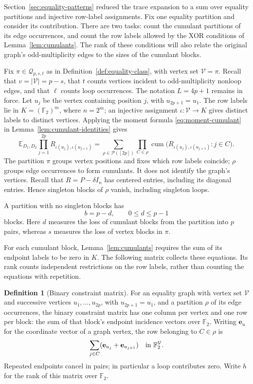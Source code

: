 \documentclass[11pt]{article}
\theoremstyle{definition}
\newtheorem{definition}{Definition}[section]
\theoremstyle{remark}
\theoremstyle{plain}
\newcommand{\E}{\mathbb E}
\newcommand{\F}{\mathbb F}
\DeclareMathOperator{\cum}{cum}
\begin{document}
Section~\ref{sec:equality-patterns} reduced the trace expansion to a
sum over equality partitions and injective row-label assignments.
Fix one equality partition and consider its contribution. There
are two tasks: count the cumulant partitions of its edge occurrences,
and count the row labels allowed by the XOR conditions of
Lemma~\ref{lem:cumulants}. The rank of these conditions will also
relate the original graph's odd-multiplicity edges to the sizes
of the cumulant blocks.

Fix $\pi\in\mathcal Q_{p,s,t}$ as in
Definition~\ref{def:equality-class}, with vertex set $\mathcal V=\pi$.
Recall that $v=|\mathcal V|=p-s$, that $t$ counts vertices incident
to odd-multiplicity nonloop edges, and that $\ell$ counts loop
occurrences. The notation $L=4p+1$ remains in force.
Let $u_j$ be the vertex containing position $j$, with $u_{2p+1}=u_1$.
The row labels lie in $K=(\F_2)^m$, where $n=2^m$; an injective
assignment $\iota:\mathcal V\to K$ gives distinct labels to distinct
vertices. Applying the moment formula \eqref{eq:moment-cumulant}
in Lemma~\ref{lem:cumulant-identities} gives
\begin{equation}\label{eq:entry-moment-expansion}
 \E_{D_1,D_2}\prod_{j=1}^{2p}R_{\iota(u_j),\iota(u_{j+1})}
   =\sum_{\rho\in\mathcal P([2p])}
      \prod_{C\in\rho}
        \cum\bigl(R_{\iota(u_j),\iota(u_{j+1})}:j\in C\bigr).
\end{equation}
The partition $\pi$ groups vertex positions and fixes which row
labels coincide; $\rho$ groups edge occurrences to form cumulants.
It does not identify the graph's vertices. Recall that
$R=P-\delta I_n$ has centered entries, including its diagonal
entries. Hence singleton blocks of $\rho$ vanish, including singleton
loops.

\begin{samepage}
A partition with no singleton blocks has
\[
                         b=p-d,\qquad 0\le d\le p-1
\]
blocks. Here $d$ measures the loss of cumulant blocks from the
partition into $p$ pairs, whereas $s$ measures the loss of vertex
blocks in $\pi$.
\end{samepage}

For each cumulant block, Lemma~\ref{lem:cumulants} requires the sum
of its endpoint labels to be zero in $K$. The following matrix
collects these equations. Its rank counts independent restrictions
on the row labels, rather than counting the equations with repetition.

\begin{definition}[Binary constraint matrix]\label{def:binary-constraint}
For an equality graph with vertex set $\mathcal V$ and successive
vertices $u_1,\ldots,u_{2p}$, with $u_{2p+1}=u_1$, and a
partition $\rho$ of its edge
occurrences, the binary constraint matrix has one column per vertex
and one row per block: the
sum of that block's endpoint incidence vectors over \(\F_2\).
Writing $\mathbf e_u$ for the coordinate vector of a graph vertex,
the row belonging to $C\in\rho$ is
\[
 \sum_{j\in C}(\mathbf e_{u_j}+\mathbf e_{u_{j+1}})
                       \quad\hbox{in }\F_2^{\mathcal V}.
\]
Repeated endpoints cancel in pairs; in particular a loop
contributes zero. Write $h$ for the rank of this matrix over $\F_2$.
\end{definition}
\end{document}
